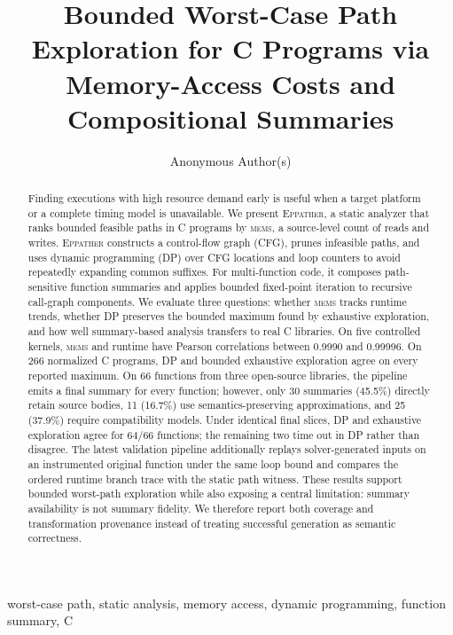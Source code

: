 \documentclass[10pt,conference]{IEEEtran}
\newcommand{\mems}{\textsc{mems}\xspace}
\newcommand{\tool}{\textsc{Eppather}\xspace}
\begin{document}
\title{Bounded Worst-Case Path Exploration for C Programs via Memory-Access Costs and Compositional Summaries}

\author{Anonymous Author(s)}
\maketitle

\begin{abstract}
Finding executions with high resource demand early is useful when a target platform or a complete timing model is unavailable. We present \tool, a static analyzer that ranks bounded feasible paths in C programs by \mems, a source-level count of reads and writes. \tool constructs a control-flow graph (CFG), prunes infeasible paths, and uses dynamic programming (DP) over CFG locations and loop counters to avoid repeatedly expanding common suffixes. For multi-function code, it composes path-sensitive function summaries and applies bounded fixed-point iteration to recursive call-graph components. We evaluate three questions: whether \mems tracks runtime trends, whether DP preserves the bounded maximum found by exhaustive exploration, and how well summary-based analysis transfers to real C libraries. On five controlled kernels, \mems and runtime have Pearson correlations between 0.9990 and 0.99996. On 266 normalized C programs, DP and bounded exhaustive exploration agree on every reported maximum. On 66 functions from three open-source libraries, the pipeline emits a final summary for every function; however, only 30 summaries (45.5\%) directly retain source bodies, 11 (16.7\%) use semantics-preserving approximations, and 25 (37.9\%) require compatibility models. Under identical final slices, DP and exhaustive exploration agree for 64/66 functions; the remaining two time out in DP rather than disagree. The latest validation pipeline additionally replays solver-generated inputs on an instrumented original function under the same loop bound and compares the ordered runtime branch trace with the static path witness. These results support bounded worst-path exploration while also exposing a central limitation: summary availability is not summary fidelity. We therefore report both coverage and transformation provenance instead of treating successful generation as semantic correctness.
\end{abstract}

\begin{IEEEkeywords}
worst-case path, static analysis, memory access, dynamic programming, function summary, C
\end{IEEEkeywords}
\end{document}
